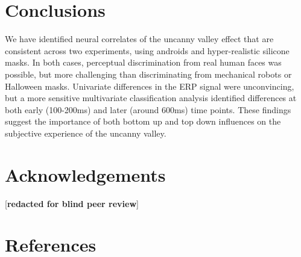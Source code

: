 \documentclass[
]{article}
\begin{document}
\section{Conclusions}\label{conclusions}

We have identified neural correlates of the uncanny valley effect that are consistent across two experiments, using androids and hyper-realistic silicone masks. In both cases, perceptual discrimination from real human faces was possible, but more challenging than discriminating from mechanical robots or Halloween masks. Univariate differences in the ERP signal were unconvincing, but a more sensitive multivariate classification analysis identified differences at both early (100-200ms) and later (around 600ms) time points. These findings suggest the importance of both bottom up and top down influences on the subjective experience of the uncanny valley.

\section{Acknowledgements}\label{acknowledgements}

{[}\textbf{redacted for blind peer review}{]}

\section*{References}\label{references}
\end{document}
